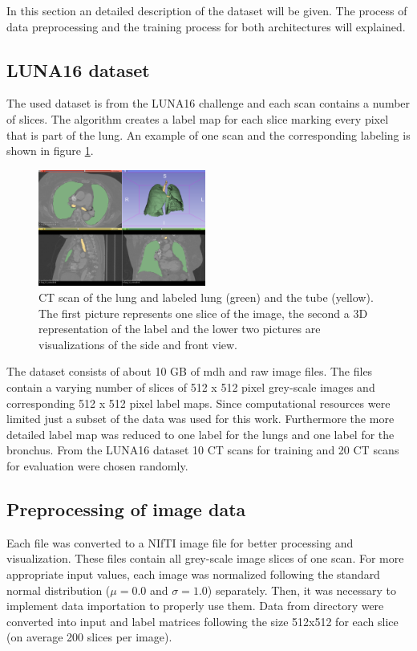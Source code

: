 
In this section an detailed description of the dataset will be given. The process of data preprocessing and the training process for both architectures will explained.

\subsection{LUNA16 dataset}

The used dataset is from the LUNA16 challenge and each scan contains a number of slices. The algorithm creates a label map for each slice marking every pixel that is part of the lung. An example of one scan and the corresponding labeling is shown in figure \ref{scan_picture}.

\begin{figure}[h!]
	\includegraphics[width=0.49\textwidth, angle=0]{files/Fulllayoutprediction.png}
	\caption{CT scan of the lung and labeled lung (green) and the tube (yellow). The first picture represents one slice of the image, the second a 3D representation of the label and the lower two pictures are visualizations of the side and front view.}
	\label{scan_picture}
\end{figure}

The dataset consists of about 10 GB of mdh and raw image files. The files contain a varying number of slices of 512 x 512 pixel grey-scale images and corresponding 512 x 512 pixel label maps. Since computational resources were limited just a subset of the data was used for this work. Furthermore the more detailed label map was reduced to one label for the lungs and one label for the bronchus.\newline
From the LUNA16 dataset 10 CT scans for training and 20 CT scans for evaluation were chosen randomly.

\subsection{Preprocessing of image data}
Each file was converted to a NIfTI image file for better processing and visualization. These files contain all grey-scale image slices of one scan. For more appropriate input values, each image was normalized following the standard normal distribution ($\mu = 0.0$ and $\sigma = 1.0$) separately.\newline
Then, it was necessary to implement data importation to properly use them. Data from directory were converted into input and label matrices following the size 512x512 for each slice (on average 200 slices per image).

